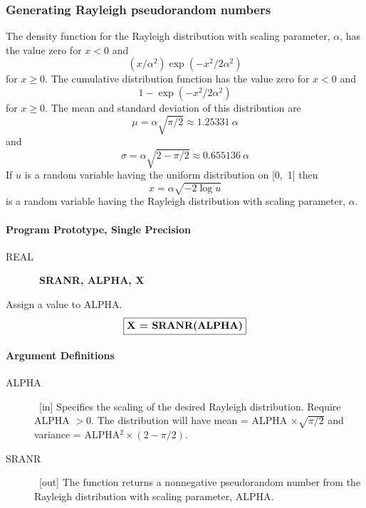 \documentclass[twoside]{MATH77}
\begin{document}
\subsubsection{Generating Rayleigh pseudorandom numbers}

The density function for the Rayleigh distribution with scaling parameter, $%
\alpha $, has the value zero for $x < 0$ and
\begin{equation*}
(x/\alpha ^2) \exp (-x^2/2\alpha ^2)
\end{equation*}
for $x \geq 0$. The cumulative distribution function has the value zero for $%
x < 0$ and
\begin{equation*}
1 - \exp(-x^2/2 \alpha ^2)
\end{equation*}
for $x \geq 0$. The mean and standard deviation of this distribution are
\begin{equation*}
\mu = \alpha \sqrt{\pi /2} \approx 1.25331\ \alpha
\end{equation*}
and
\begin{equation*}
\sigma = \alpha \sqrt{2 - \pi /2} \approx 0.655136\ \alpha
\end{equation*}
If $u$ is a random variable having the uniform distribution on [0,~1] then
\begin{equation*}
x = \alpha \sqrt{-2 \log u}
\end{equation*}
is a random variable having the Rayleigh distribution with scaling
parameter, $\alpha .$

\paragraph{Program Prototype, Single Precision}

\begin{description}
\item[REAL]  \ {\bf SRANR, ALPHA, X}
\end{description}

Assign a value to ALPHA.
$$
\fbox{{\bf X = SRANR(ALPHA)}}
$$
\paragraph{Argument Definitions}

\begin{description}
\item[ALPHA]  \ [in] Specifies the scaling of the desired Rayleigh
distribution. Require ALPHA $>0$. The distribution will have mean = ALPHA $%
\times \sqrt{\pi /2}$ and variance = ALPHA$^2\times (2-\pi /2).$

\item[SRANR]  \ [out] The function returns a nonnegative pseudorandom number
from the Rayleigh distribution with scaling parameter, ALPHA.
\end{description}
\end{document}
